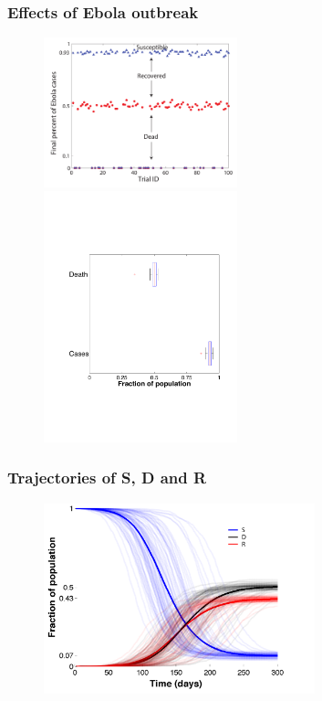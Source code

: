 \documentclass[30pt]{beamer}
\begin{document}
\begin{frame}
\frametitle{Effects of Ebola outbreak}
\begin{figure}
\includegraphics[width = 0.5\textwidth]{N1000Scatter.pdf}
\includegraphics[width = 0.5\textwidth]{BWplot.pdf}

\end{figure}
\end{frame}

\begin{frame}
\frametitle{Trajectories of S, D and R}
\begin{figure}
\includegraphics[width = 0.7\textwidth]{SDRcurves.pdf}
\end{figure}
\end{frame}
\end{document}
